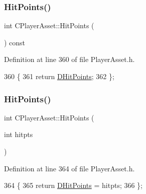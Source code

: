 \subsubsection{\texorpdfstring{Hit\+Points()}{HitPoints()}\hspace{0.1cm}{\footnotesize\ttfamily [1/2]}}
{\footnotesize\ttfamily int C\+Player\+Asset\+::\+Hit\+Points (\begin{DoxyParamCaption}{ }\end{DoxyParamCaption}) const\hspace{0.3cm}{\ttfamily [inline]}}



Definition at line 360 of file Player\+Asset.\+h.


\begin{DoxyCode}
360                              \{
361             \textcolor{keywordflow}{return} \hyperlink{classCPlayerAsset_a331750935bf594e665544085fb74e89d}{DHitPoints};
362         \};
\end{DoxyCode}
\hypertarget{classCPlayerAsset_a5da6f77ba278109e159d392035f4e1dd}{}\label{classCPlayerAsset_a5da6f77ba278109e159d392035f4e1dd} 
\subsubsection{\texorpdfstring{Hit\+Points()}{HitPoints()}\hspace{0.1cm}{\footnotesize\ttfamily [2/2]}}
{\footnotesize\ttfamily int C\+Player\+Asset\+::\+Hit\+Points (\begin{DoxyParamCaption}\item[{int}]{hitpts }\end{DoxyParamCaption})\hspace{0.3cm}{\ttfamily [inline]}}



Definition at line 364 of file Player\+Asset.\+h.


\begin{DoxyCode}
364                                  \{
365             \textcolor{keywordflow}{return} \hyperlink{classCPlayerAsset_a331750935bf594e665544085fb74e89d}{DHitPoints} = hitpts;
366         \};
\end{DoxyCode}
\hypertarget{classCPlayerAsset_afe41876166e7a3ad8d3d5465595d3de7}{}\label{classCPlayerAsset_afe41876166e7a3ad8d3d5465595d3de7} 
